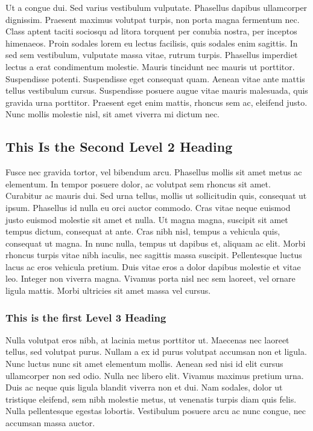 Ut a congue dui. Sed varius vestibulum vulputate. Phasellus dapibus ullamcorper dignissim. Praesent maximus volutpat turpis, non porta magna fermentum nec. Class aptent taciti sociosqu ad litora torquent per conubia nostra, per inceptos himenaeos. Proin sodales lorem eu lectus facilisis, quis sodales enim sagittis. In sed sem vestibulum, vulputate massa vitae, rutrum turpis. Phasellus imperdiet lectus a erat condimentum molestie. Mauris tincidunt nec mauris ut porttitor. Suspendisse potenti. Suspendisse eget consequat quam. Aenean vitae ante mattis tellus vestibulum cursus. Suspendisse posuere augue vitae mauris malesuada, quis gravida urna porttitor. Praesent eget enim mattis, rhoncus sem ac, eleifend justo. Nunc mollis molestie nisl, sit amet viverra mi dictum nec.

\subsection{This Is the Second Level 2 Heading}

Fusce nec gravida tortor, vel bibendum arcu. Phasellus mollis sit amet metus ac elementum. In tempor posuere dolor, ac volutpat sem rhoncus sit amet. Curabitur ac mauris dui. Sed urna tellus, mollis ut sollicitudin quis, consequat ut ipsum. Phasellus id nulla eu orci auctor commodo. Cras vitae neque euismod justo euismod molestie sit amet et nulla. Ut magna magna, suscipit sit amet tempus dictum, consequat at ante. Cras nibh nisl, tempus a vehicula quis, consequat ut magna. In nunc nulla, tempus ut dapibus et, aliquam ac elit. Morbi rhoncus turpis vitae nibh iaculis, nec sagittis massa suscipit. Pellentesque luctus lacus ac eros vehicula pretium. Duis vitae eros a dolor dapibus molestie et vitae leo. Integer non viverra magna. Vivamus porta nisl nec sem laoreet, vel ornare ligula mattis. Morbi ultricies sit amet massa vel cursus.

\subsubsection{This is the first Level 3 Heading}

Nulla volutpat eros nibh, at lacinia metus porttitor ut. Maecenas nec laoreet tellus, sed volutpat purus. Nullam a ex id purus volutpat accumsan non et ligula. Nunc luctus nunc sit amet elementum mollis. Aenean sed nisi id elit cursus ullamcorper non sed odio. Nulla nec libero elit. Vivamus maximus pretium urna. Duis ac neque quis ligula blandit viverra non et dui. Nam sodales, dolor ut tristique eleifend, sem nibh molestie metus, ut venenatis turpis diam quis felis. Nulla pellentesque egestas lobortis. Vestibulum posuere arcu ac nunc congue, nec accumsan massa auctor.

